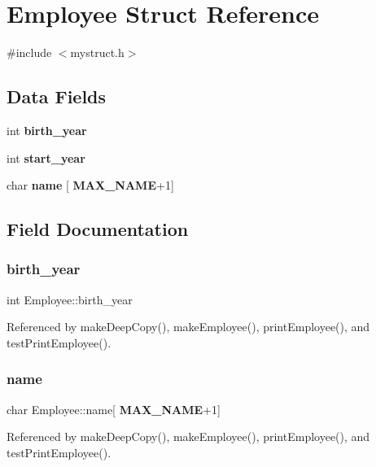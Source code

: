 \section{Employee Struct Reference}
\label{structEmployee}


{\ttfamily \#include $<$mystruct.\+h$>$}

\subsection*{Data Fields}
\begin{DoxyCompactItemize}
\item 
int \textbf{ birth\+\_\+year}
\item 
int \textbf{ start\+\_\+year}
\item 
char \textbf{ name} [\textbf{ M\+A\+X\+\_\+\+N\+A\+ME}+1]
\end{DoxyCompactItemize}


\subsection{Field Documentation}
\mbox{\label{structEmployee_a760204f198562c478aa489b14c7d1d29}} 
\subsubsection{birth\+\_\+year}
{\footnotesize\ttfamily int Employee\+::birth\+\_\+year}



Referenced by make\+Deep\+Copy(), make\+Employee(), print\+Employee(), and test\+Print\+Employee().

\mbox{\label{structEmployee_acd7c4b846e2076017e5fe21ed23ac8dd}} 
\subsubsection{name}
{\footnotesize\ttfamily char Employee\+::name[\textbf{ M\+A\+X\+\_\+\+N\+A\+ME}+1]}



Referenced by make\+Deep\+Copy(), make\+Employee(), print\+Employee(), and test\+Print\+Employee().

\mbox{\label{structEmployee_a64042e9bd1a3451ba0349b59f21325a6}} 
